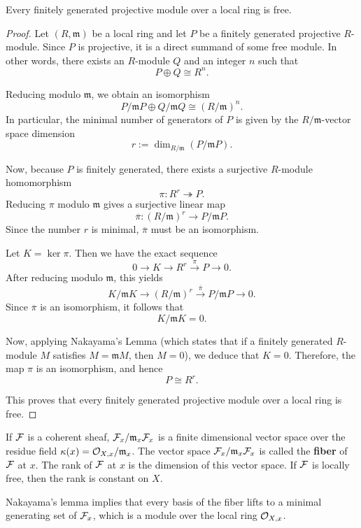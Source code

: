 \documentclass[12pt]{article}
\begin{document}
\begin{corollary}
    Every finitely generated projective module over a local ring is free. 
\end{corollary}

\begin{proof}
Let $(R,\mathfrak{m})$ be a local ring and let $P$ be a finitely generated projective $R$-module. Since $P$ is projective, it is a direct summand of some free module. In other words, there exists an $R$-module $Q$ and an integer $n$ such that
$$
P \oplus Q \cong R^n.
$$

Reducing modulo $\mathfrak{m}$, we obtain an isomorphism
$$
P/\mathfrak{m}P \oplus Q/\mathfrak{m}Q \cong (R/\mathfrak{m})^n.
$$
In particular, the minimal number of generators of $P$ is given by the $R/\mathfrak{m}$-vector space dimension
$$
r := \dim_{R/\mathfrak{m}}(P/\mathfrak{m}P).
$$

Now, because $P$ is finitely generated, there exists a surjective $R$-module homomorphism
$$
\pi \colon R^r \twoheadrightarrow P.
$$
Reducing $\pi$ modulo $\mathfrak{m}$ gives a surjective linear map
$$
\overline{\pi}\colon (R/\mathfrak{m})^r \to P/\mathfrak{m}P.
$$
Since the number $r$ is minimal, $\overline{\pi}$ must be an isomorphism.

Let $K = \ker \pi$. Then we have the exact sequence
$$
0 \to K \to R^r \xrightarrow{\pi} P \to 0.
$$
After reducing modulo $\mathfrak{m}$, this yields
$$
K/\mathfrak{m}K \to (R/\mathfrak{m})^r \xrightarrow{\overline{\pi}} P/\mathfrak{m}P \to 0.
$$
Since $\overline{\pi}$ is an isomorphism, it follows that
$$
K/\mathfrak{m}K = 0.
$$

Now, applying Nakayama’s Lemma (which states that if a finitely generated $R$-module $M$ satisfies $M = \mathfrak{m}M$, then $M = 0$), we deduce that $K = 0$. Therefore, the map $\pi$ is an isomorphism, and hence
$$
P \cong R^r.
$$

This proves that every finitely generated projective module over a local ring is free.
\end{proof}

\begin{remark}
    If ${\mathcal{F}}$ is a coherent sheaf, ${\mathcal{F}}_x/\mathfrak{m}_x {\mathcal{F}}_x$ is a finite dimensional vector space over the residue field $\kappa(x) = {\mathcal{O}}_{X,x}/\mathfrak{m}_x$. The vector space ${\mathcal{F}}_x/\mathfrak{m}_x {\mathcal{F}}_x$ is called the \textbf{fiber} of ${\mathcal{F}}$ at $x$. The rank of ${\mathcal{F}}$ at $x$ is the dimension of this vector space. If ${\mathcal{F}}$ is locally free, then the rank is constant on $X$.

Nakayama's lemma implies that every basis of the fiber lifts to a minimal generating set of ${\mathcal{F}}_x$, which is a module over the local ring ${\mathcal{O}}_{X,x}$. 
\end{remark}
\end{document}
